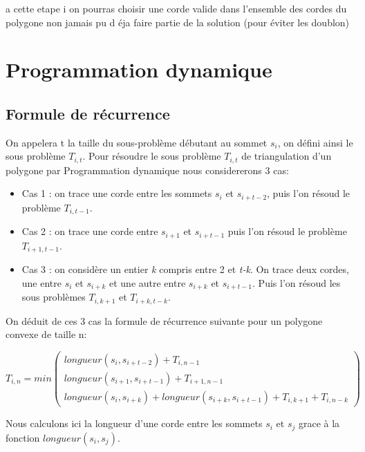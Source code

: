 \documentclass[a4paper,10pt]{article}
\begin{document}
a cette etape i on pourras choisir une corde valide dans l'ensemble des cordes du polygone non jamais pu d éja faire partie de la solution (pour éviter les doublon)

 

 
\section{Programmation dynamique}

\subsection{Formule de récurrence}



On appelera t la taille du sous-problème débutant au sommet \(s_i\), on défini ainsi le sous problème \(T_{i,t}\).
Pour résoudre le sous problème \(T_{i,t}\) de triangulation d'un polygone par Programmation dynamique nous considererons 3 cas:

\begin{itemize}
 \item Cas 1 : on trace une corde entre les sommets \(s_i\) et \(s_{i+t-2}\), puis l'on résoud le problème \(T_{i,t-1}\).
 \item Cas 2 : on trace une corde entre \(s_{i+1}\) et \(s_{i+t-1}\) puis l'on résoud le problème \(T_{i+1,t-1}\).
 \item Cas 3 : on considère un entier \emph{k} compris entre 2 et \emph{t-k}. On trace deux cordes, une entre \(s_{i}\) et \(s_{i+k}\) et une autre entre \(s_{i+k}\) et \(s_{i+t-1}\).
 Puis l'on résoud les sous problèmes \(T_{i,k+1}\) et \(T_{i+k,t-k}\).
\end{itemize}

On déduit de ces 3 cas la formule de récurrence suivante pour un polygone convexe de taille n: 

\begin{equation} 
T_{i,n} = min 
\begin{pmatrix} 
 longueur(s_i, s_{i+t-2}) + T_{i,n-1} \\
  longueur(s_{i+1}, s_{i+t-1}) + T_{i+1,n-1} \\
  longueur(s_i, s_{i+k}) + longueur(s_{i+k}, s_{i+t-1}) + T_{i,k+1} + T_{i,n-k}
\end{pmatrix}               
\end{equation}

Nous calculons ici la longueur d'une corde entre les sommets \(s_i\) et \(s_j\) grace à la fonction \( longueur(s_i, s_j) \). 
\end{document}
